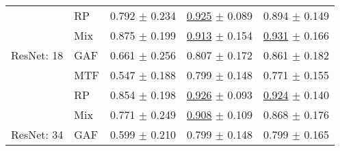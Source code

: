\begin{tabular}[t]{lllll}
 & RP & \textcolor[rgb]{0.2796610169,0.5000000000,0}{0.792} $\pm$ \textcolor[rgb]{0.8800980909,0.1199019091,0}{0.234} & \underline{\textcolor[rgb]{0.1648873072,0.5000000000,0}{0.925}} $\pm$ \textcolor[rgb]{0.1413273456,0.5000000000,0}{0.089} & \textcolor[rgb]{0.1913875598,0.5000000000,0}{0.894} $\pm$ \textcolor[rgb]{0.1342518553,0.5000000000,0}{0.149} \\
 & Mix & \textcolor[rgb]{0.0932203390,0.5000000000,0}{0.875} $\pm$ \textcolor[rgb]{0.7489308619,0.2510691381,0}{0.199} & \underline{\textcolor[rgb]{0.2283511269,0.5000000000,0}{0.913}} $\pm$ \textcolor[rgb]{0.7681030633,0.2318969367,0}{0.154} & \underline{\textcolor[rgb]{0.0526315789,0.5000000000,0}{0.931}} $\pm$ \textcolor[rgb]{0.2342744058,0.5000000000,0}{0.166} \\
ResNet: 18 & GAF & \textcolor[rgb]{0.5728813559,0.4271186441,0}{0.661} $\pm$ \textcolor[rgb]{0.9624354790,0.0375645210,0}{0.256} & \textcolor[rgb]{0.8111901938,0.1888098062,0}{0.807} $\pm$ \textcolor[rgb]{0.9493323314,0.0506676686,0}{0.172} & \textcolor[rgb]{0.3157894737,0.5000000000,0}{0.861} $\pm$ \textcolor[rgb]{0.3329018876,0.5000000000,0}{0.182} \\
 & MTF & \textcolor[rgb]{0.8271186441,0.1728813559,0}{0.547} $\pm$ \textcolor[rgb]{0.7063509212,0.2936490788,0}{0.188} & \textcolor[rgb]{0.8546856465,0.1453143535,0}{0.799} $\pm$ \textcolor[rgb]{0.7094231768,0.2905768232,0}{0.148} & \textcolor[rgb]{0.6578947368,0.3421052632,0}{0.771} $\pm$ \textcolor[rgb]{0.1699387006,0.5000000000,0}{0.155} \\
 & RP & \textcolor[rgb]{0.1398305085,0.5000000000,0}{0.854} $\pm$ \textcolor[rgb]{0.7444595929,0.2555404071,0}{0.198} & \underline{\textcolor[rgb]{0.1565836299,0.5000000000,0}{0.926}} $\pm$ \textcolor[rgb]{0.1835466762,0.5000000000,0}{0.093} & \underline{\textcolor[rgb]{0.0789473684,0.5000000000,0}{0.924}} $\pm$ \textcolor[rgb]{0.0750675489,0.5000000000,0}{0.140} \\
 & Mix & \textcolor[rgb]{0.3262711864,0.5000000000,0}{0.771} $\pm$ \textcolor[rgb]{0.9352715680,0.0647284320,0}{0.249} & \underline{\textcolor[rgb]{0.2566231712,0.5000000000,0}{0.908}} $\pm$ \textcolor[rgb]{0.3380258320,0.5000000000,0}{0.109} & \textcolor[rgb]{0.2894736842,0.5000000000,0}{0.868} $\pm$ \textcolor[rgb]{0.2929200830,0.5000000000,0}{0.176} \\
ResNet: 34 & GAF & \textcolor[rgb]{0.7115819209,0.2884180791,0}{0.599} $\pm$ \textcolor[rgb]{0.7873909879,0.2126090121,0}{0.210} & \textcolor[rgb]{0.8546856465,0.1453143535,0}{0.799} $\pm$ \textcolor[rgb]{0.7094231768,0.2905768232,0}{0.148} & \textcolor[rgb]{0.5526315789,0.4473684211,0}{0.799} $\pm$ \textcolor[rgb]{0.2256144330,0.5000000000,0}{0.165} \\

\end{tabular}
